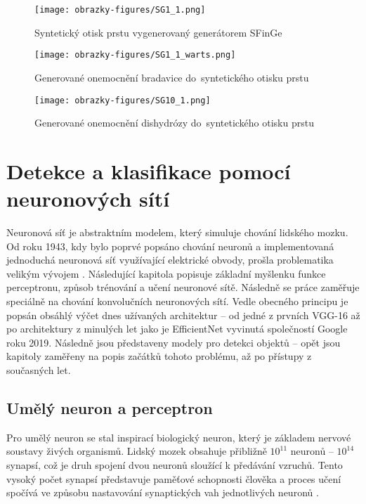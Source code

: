 \begin{figure}[!htbp]
  \begin{minipage}[b]{0.3\linewidth}
    \centering
    \texttt{[image: obrazky-figures/SG1\_1.png]}
    \caption{Syntetický otisk prstu vygenerovaný generátorem SFinGe}
    \label{fig:sfinge}
  \end{minipage}
  \hspace{0.5cm}
  \begin{minipage}[b]{0.3\linewidth}
    \centering
    \texttt{[image: obrazky-figures/SG1\_1\_warts.png]}
    \caption{Generované onemocnění bradavice do~syntetického otisku prstu}
     \label{fig:sfinge2}
  \end{minipage}
  \hspace{0.5cm}
  \begin{minipage}[b]{0.3\linewidth}
    \centering
    \texttt{[image: obrazky-figures/SG10\_1.png]}
    \caption{Generované onemocnění dishydrózy do~syntetického otisku prstu}
     \label{fig:sfinge3}
  \end{minipage}
\end{figure}

\chapter{Detekce a klasifikace pomocí neuronových sítí}
Neuronová síť je abstraktním modelem, který simuluje chování lidského mozku. Od roku 1943, kdy bylo poprvé popsáno chování neuronů a implementovaná jednoduchá neuronová síť využívající elektrické obvody, prošla problematika velikým vývojem \cite{ANNHistory}. Následující kapitola popisuje základní myšlenku funkce perceptronu, způsob trénování a učení neuronové sítě. Následně se práce zaměřuje speciálně na chování konvolučních neuronových sítí. Vedle obecného principu je popsán obsáhlý výčet dnes užívaných architektur -- od jedné z prvních VGG-16 až po architektury z minulých let jako je EfficientNet vyvinutá společností Google roku 2019. Následně jsou představeny modely pro detekci objektů -- opět jsou kapitoly zaměřeny na popis začátků tohoto problému, až po přístupy z současných let.
\section{Umělý neuron a perceptron}
Pro umělý neuron se stal inspirací biologický neuron, který je základem nervové soustavy živých organismů. Lidský mozek obsahuje přibližně $10^{11}$ neuronů -- $10^{14}$ synapsí, což je druh spojení dvou neuronů sloužící k předávání vzruchů. Tento vysoký počet synapsí představuje paměťové schopnosti člověka a proces učení spočívá ve způsobu nastavování synaptických vah jednotlivých neuronů \cite{IZULecture}. 

